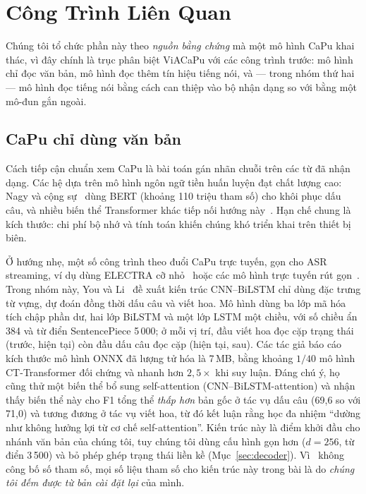 \documentclass[conference,onecolumn]{IEEEtran}
\begin{document}
\section{Công Trình Liên Quan}
\label{sec:related}

Chúng tôi tổ chức phần này theo \emph{nguồn bằng chứng} mà một mô hình CaPu khai
thác, vì đây chính là trục phân biệt ViACaPu với các công trình trước: mô hình chỉ
đọc văn bản, mô hình đọc thêm tín hiệu tiếng nói, và --- trong nhóm thứ hai --- mô
hình đọc tiếng nói bằng cách can thiệp vào bộ nhận dạng so với bằng một mô-đun gắn
ngoài.

\subsection{CaPu chỉ dùng văn bản}
Cách tiếp cận chuẩn xem CaPu là bài toán gán nhãn chuỗi trên các từ đã nhận dạng.
Các hệ dựa trên mô hình ngôn ngữ tiền huấn luyện đạt chất lượng cao: Nagy và cộng
sự~\cite{bertpunct} dùng BERT (khoảng 110 triệu tham số) cho khôi phục dấu câu, và
nhiều biến thể Transformer khác tiếp nối hướng này~\cite{nguyen2019,sunkara2020}.
Hạn chế chung là kích thước: chi phí bộ nhớ và tính toán khiến chúng khó triển khai
trên thiết bị biên.

Ở hướng nhẹ, một số công trình theo đuổi CaPu trực tuyến, gọn cho ASR streaming,
ví dụ dùng ELECTRA cỡ nhỏ~\cite{polacek2023} hoặc các mô hình trực tuyến rút
gọn~\cite{lightweight2025}. Trong nhóm này, You và Li~\cite{you2024lightweight} đề
xuất kiến trúc CNN--BiLSTM chỉ dùng đặc trưng từ vựng, dự đoán đồng thời dấu câu và
viết hoa. Mô hình dùng ba lớp
mã hóa tích chập phần dư, hai lớp BiLSTM và một lớp LSTM một chiều, với số chiều ẩn
384 và từ điển SentencePiece 5\,000; ở mỗi vị trí, đầu viết hoa đọc cặp trạng thái
(trước, hiện tại) còn đầu dấu câu đọc cặp (hiện tại, sau). Các tác giả báo cáo kích
thước mô hình ONNX đã lượng tử hóa là 7\,MB, bằng khoảng $1/40$ mô hình
CT-Transformer đối chứng và nhanh hơn $2{,}5\times$ khi suy luận. Đáng chú ý, họ
cũng thử một biến thể bổ sung self-attention (CNN--BiLSTM-attention) và nhận thấy
biến thể này cho F1 tổng thể \emph{thấp hơn} bản gốc ở tác vụ dấu câu (69{,}6 so
với 71{,}0) và tương đương ở tác vụ viết hoa, từ đó kết luận rằng học đa nhiệm
``dường như không hưởng lợi từ cơ chế self-attention''. Kiến trúc này là điểm khởi
đầu cho nhánh văn bản của chúng tôi, tuy chúng tôi dùng cấu hình gọn hơn ($d=256$,
từ điển 3\,500) và bỏ phép ghép trạng thái liền kề (Mục~\ref{sec:decoder}).
Vì~\cite{you2024lightweight} không công bố số tham số, mọi số liệu tham số cho kiến
trúc này trong bài là do \emph{chúng tôi đếm được từ bản cài đặt lại} của mình.
\end{document}
